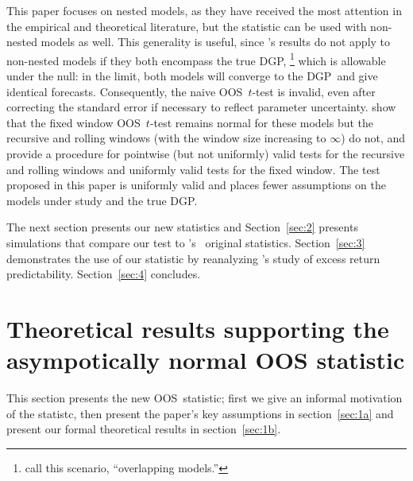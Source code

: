\documentclass[12pt,fleqn]{article}
\newcommand\citepos[2][]{\citeauthor{#2}'s \citeyearpar[#1]{#2}}
\newcommand\poscw{\citeauthor{ClW:06}'s \citeyearpar{ClW:06,ClW:07}}
\theoremstyle{definition}
\newcommand{\dgp}{DGP}
\newcommand{\oos}{OOS}
\begin{document}
This paper focuses on nested models, as they have received the most
attention in the empirical and theoretical literature, but the
statistic can be used with non-nested models as well.  This generality
is useful, since \citepos{Wes:96} results do not apply to non-nested
models if they both encompass the true \dgp,%
\footnote{\citet{ClM:11b}
  call this scenario, ``overlapping models.''} %
which is allowable
under the null: in the limit, both models will converge to the \dgp\
and give identical forecasts.  Consequently, the naive \oos\ $t$-test
is invalid, even after correcting the standard error if necessary to
reflect parameter uncertainty.  \citet{ClM:11b} show that the fixed
window \oos\ $t$-test remains normal for these models but the
recursive and rolling windows (with the window size increasing to
$\infty$) do not, and provide a procedure for pointwise (but not
uniformly) valid tests for the recursive and rolling windows and
uniformly valid tests for the fixed window.  The test proposed in this
paper is uniformly valid and places fewer assumptions on the models
under study and the true \dgp.

The next section presents our new statistics and Section~\ref{sec:2} presents
simulations that compare our test to \poscw\ original
statistics.  Section~\ref{sec:3} demonstrates the use of our statistic
by reanalyzing \citepos{GoW:08} study of excess return
predictability. Section~\ref{sec:4} concludes.

\section{Theoretical results supporting the asympotically normal OOS statistic}
\label{sec:1}

This section presents the new \oos\ statistic; first we give an
informal motivation of the statistc, then present the paper's key
assumptions in section~\ref{sec:1a} and present our formal theoretical
results in section~\ref{sec:1b}.
\end{document}

